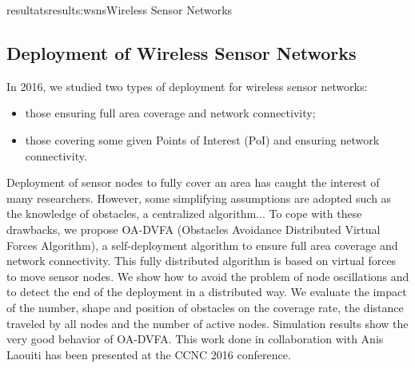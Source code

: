 \documentclass{ra2016}
\begin{document}

\begin{module}{resultats}{results:wsns}{Wireless Sensor Networks}

\subsection{Deployment of Wireless Sensor Networks}

\begin{participants}
\end{participants}

In 2016, we studied two types of deployment for wireless sensor networks:

\begin{itemize}
    \item those ensuring full area coverage and network connectivity;
    \item those covering some given Points of Interest (PoI) and ensuring network connectivity.\\
\end{itemize}

Deployment of sensor nodes to fully cover an area has caught the interest of many researchers.
However, some simplifying assumptions are adopted such as the knowledge of obstacles, a centralized algorithm...
To cope with these drawbacks, we propose OA-DVFA (Obstacles Avoidance Distributed Virtual Forces Algorithm), a self-deployment algorithm to ensure full area coverage and network connectivity.
This fully distributed algorithm is based on virtual forces to move sensor nodes.
We show how to avoid the problem of node oscillations and to detect the end of the deployment in a distributed way. 
We evaluate the impact of the number, shape and position of obstacles on the coverage rate, the distance traveled by all nodes and the number of active nodes.
Simulation results show the very good behavior of OA-DVFA.
This work done in collaboration with Anis Laouiti has been presented at the CCNC 2016 conference.


\end{module}
\end{document}
